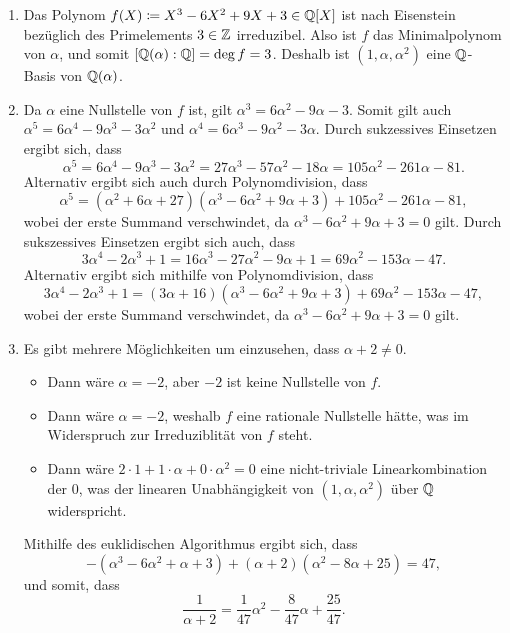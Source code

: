 \begin{solution}
  \begin{enumerate}
    \item
      Das Polynom $f(X) \coloneqq X^3 - 6 X^2 + 9 X + 3 \in \mathbb{Q}[X]$ ist nach Eisenstein bezüglich des Primelements $3 \in \mathbb{Z}$ irreduzibel.
      Also ist $f$ das Minimalpolynom von $\alpha$, und somit $[\mathbb{Q}(\alpha) : \mathbb{Q}] = \deg f = 3$.
      Deshalb ist $(1, \alpha, \alpha^2)$ eine $\mathbb{Q}$-Basis von $\mathbb{Q}(\alpha)$.
    
    \item
      Da $\alpha$ eine Nullstelle von $f$ ist, gilt $\alpha^3 = 6 \alpha^2 - 9 \alpha - 3$.
      Somit gilt auch $\alpha^5 = 6 \alpha^4 - 9 \alpha^3 - 3 \alpha^2$ und $\alpha^4 = 6 \alpha^3 - 9 \alpha^2 - 3 \alpha$.
      Durch sukzessives Einsetzen ergibt sich, dass
      \[
          \alpha^5
        = 6 \alpha^4 - 9 \alpha^3 - 3 \alpha^2
        = 27 \alpha^3 - 57 \alpha^2 - 18 \alpha
        = 105 \alpha^2 - 261 \alpha - 81.
      \]
      Alternativ ergibt sich auch durch Polynomdivision, dass
      \[
          \alpha^5
        = (\alpha^2 + 6 \alpha + 27)(\alpha^3 - 6 \alpha^2 + 9 \alpha + 3) + 105 \alpha^2 - 261 \alpha - 81,
      \]
      wobei der erste Summand verschwindet, da $\alpha^3 - 6 \alpha^2 + 9 \alpha + 3 = 0$ gilt.
      Durch sukszessives Einsetzen ergibt sich auch, dass
      \[
          3 \alpha^4 - 2 \alpha^3 + 1
        = 16 \alpha^3 - 27 \alpha^2 - 9 \alpha + 1
        = 69 \alpha^2 - 153 \alpha - 47.
      \]
      Alternativ ergibt sich mithilfe von Polynomdivision, dass
      \[
          3 \alpha^4 - 2 \alpha^3 + 1
        = (3 \alpha + 16)(\alpha^3 - 6 \alpha^2 + 9 \alpha + 3) + 69 \alpha^2 - 153 \alpha - 47,
      \]
      wobei der erste Summand verschwindet, da $\alpha^3 - 6 \alpha^2 + 9 \alpha + 3 = 0$ gilt.
    
    \item
      Es gibt mehrere Möglichkeiten um einzusehen, dass $\alpha + 2 \neq 0$.
      \begin{itemize}
        \item
          Dann wäre $\alpha = -2$, aber $-2$ ist keine Nullstelle von $f$.
        \item
          Dann wäre $\alpha = -2$, weshalb $f$ eine rationale Nullstelle hätte, was im Widerspruch zur Irreduziblität von $f$ steht.
        \item
          Dann wäre $2 \cdot 1 + 1 \cdot \alpha + 0 \cdot \alpha^2 = 0$ eine nicht-triviale Linearkombination der $0$, was der linearen Unabhängigkeit von $(1, \alpha, \alpha^2)$ über $\mathbb{Q}$ widerspricht.
      \end{itemize}
      Mithilfe des euklidischen Algorithmus ergibt sich, dass
      \[
        -(\alpha^3 - 6 \alpha^2 + \alpha + 3) + (\alpha + 2)(\alpha^2 - 8 \alpha + 25) = 47,
      \]
      und somit, dass
      \[
          \frac{1}{\alpha + 2}
        = \frac{1}{47} \alpha^2 - \frac{8}{47} \alpha + \frac{25}{47}.  
      \]
  \end{enumerate}
\end{solution}


